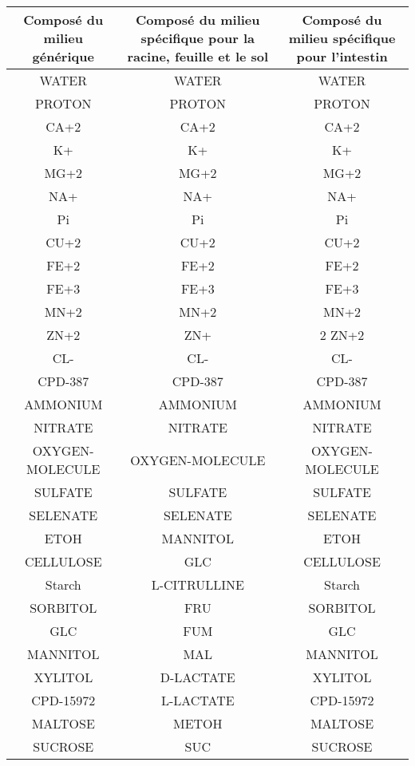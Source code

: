 \documentclass[../main.tex]{subfiles}
\begin{document}
\begin{table}[H]
\centering
\begin{adjustbox}{width=0.43\textwidth}
\begin{tabular}{|c|c|c|}
\hline
\begin{minipage}[t]{4cm}Composé du milieu générique\end{minipage}  & \begin{minipage}[t]{4cm}Composé du milieu spécifique pour la racine, feuille et le sol \end{minipage} & \begin{minipage}[t]{4cm}Composé du milieu spécifique pour l'intestin\end{minipage} \\
\hline
WATER&	WATER&	WATER \\
PROTON	&PROTON	&PROTON \\
CA+2	&CA+2	&CA+2 \\
K+	&K+	&K+ \\
MG+2	&MG+2	&MG+2 \\
NA+	&NA+&NA+ \\
Pi	&Pi	&Pi \\
CU+2&	CU+2	&CU+2 \\
FE+2&	FE+2	&FE+2 \\
FE+3&	FE+3	&FE+3 \\
MN+2	&MN+2	&MN+2 \\
ZN+2	&ZN+&2	ZN+2 \\
CL-	&CL-&	CL- \\
CPD-387	&CPD-387	&CPD-387 \\
AMMONIUM&	AMMONIUM&	AMMONIUM \\
NITRATE	&NITRATE	&NITRATE \\
OXYGEN-MOLECULE	&OXYGEN-MOLECULE	&OXYGEN-MOLECULE \\
SULFATE	&SULFATE	&SULFATE \\
SELENATE	&SELENATE	&SELENATE \\
ETOH	&MANNITOL	&ETOH \\
CELLULOSE	&GLC	&CELLULOSE \\
Starch&	L-CITRULLINE	&Starch \\
SORBITOL&	FRU	&SORBITOL \\
GLC	&FUM	&GLC \\
MANNITOL&	MAL	&MANNITOL \\
XYLITOL&	D-LACTATE	&XYLITOL \\
CPD-15972&	L-LACTATE&	CPD-15972 \\
MALTOSE&	METOH	&MALTOSE \\
SUCROSE&	SUC	&SUCROSE \\

\end{tabular}
\end{adjustbox}
\end{table}
\end{document}
